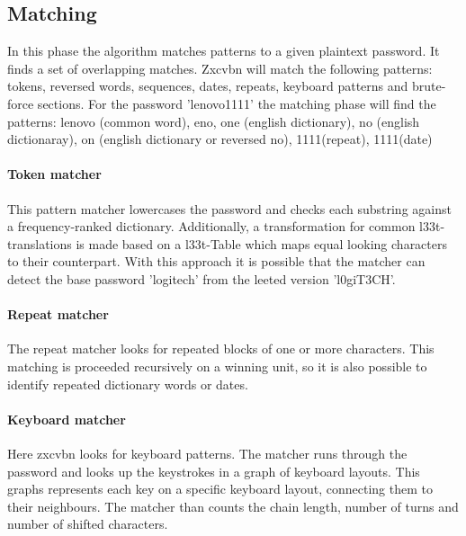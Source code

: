\documentclass[12pt,a4paper]{article}
\begin{document}
\subsection{Matching}
In this phase the algorithm matches patterns to a given plaintext password. 
It finds a set of overlapping matches. Zxcvbn will match the following patterns: tokens, reversed words, sequences, dates, repeats, keyboard patterns and brute-force sections. For the password 'lenovo1111' the matching phase will find the patterns: lenovo (common word), eno, one (english dictionary), no (english dictionaray), on (english dictionary or reversed no), 1111(repeat), 1111(date)


\paragraph{Token matcher} 

This pattern matcher lowercases the password and checks each substring against a frequency-ranked dictionary. 
Additionally, a transformation for common l33t-translations is made based on a l33t-Table which maps equal looking characters to their counterpart.
With this approach it is possible that the matcher can detect the base password 'logitech' from the leeted version 'l0giT3CH'.

\paragraph{Repeat matcher}
The repeat matcher looks for repeated blocks of one or more characters.
This matching is proceeded recursively on a winning unit, so it is also possible to identify repeated dictionary words or dates.


\paragraph{Keyboard matcher}
Here zxcvbn looks for keyboard patterns. The matcher runs through the password and looks up the keystrokes in a graph of keyboard layouts. This graphs represents each key on a specific keyboard layout, connecting them to their neighbours. The matcher than counts the chain length, number of turns and number of shifted characters.
\end{document}
